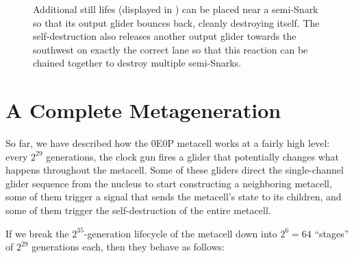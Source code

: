 \begin{figure}[!htb]
	\centering
	\caption{Additional still lifes (displayed in ) can be placed near a semi-Snark so that its output glider bounces back, cleanly destroying itself. The self-destruction also releases another output glider towards the southwest on exactly the correct lane so that this reaction can be chained together to destroy multiple semi-Snarks.}
	\label{fig:semi_snark_self_destruct}
\end{figure}


\section{A Complete Metageneration}\label{sec:0e0p_timeline}

So far, we have described how the 0E0P metacell works at a fairly high level: every $2^{29}$ generations, the clock gun fires a glider that potentially changes what happens throughout the metacell. Some of these gliders direct the single-channel glider sequence from the nucleus to start constructing a neighboring metacell, some of them trigger a signal that sends the metacell's state to its children, and some of them trigger the self-destruction of the entire metacell.

If we break the $2^{35}$-generation lifecycle of the metacell down into $2^6 = 64$ ``stages'' of $2^{29}$ generations each, then they behave as follows:\smallskip

